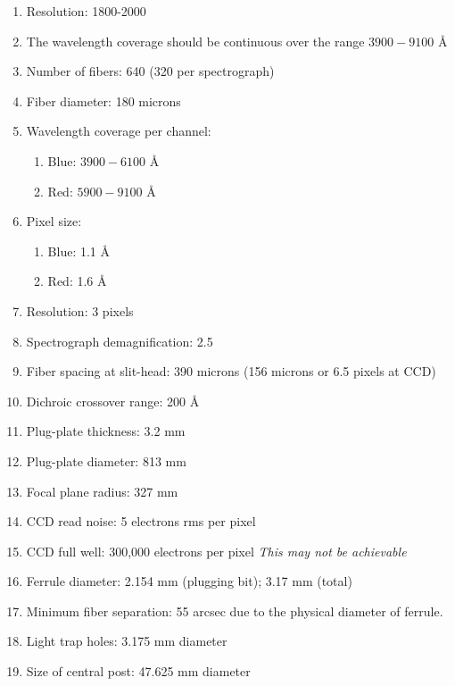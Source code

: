 \begin{enumerate}
\item Resolution: 1800-2000
\item The wavelength coverage should be continuous over the range $3900-9100$ \AA
\item Number of fibers: 640 (320 per spectrograph)
\item Fiber diameter: 180 microns
\item Wavelength coverage per channel:
\begin{enumerate}
\item Blue: $3900-6100$ \AA
\item Red: $5900-9100$ \AA
\end{enumerate}
\item Pixel size: 
\begin{enumerate}
\item Blue: 1.1 \AA
\item Red: 1.6 \AA
\end{enumerate}

\item Resolution: 3 pixels

\item Spectrograph demagnification: 2.5

\item Fiber spacing at slit-head: 390 microns (156 microns or 6.5 pixels at
CCD)

\item Dichroic crossover range: 200 \AA

\item Plug-plate thickness: 3.2 mm

\item Plug-plate diameter: 813 mm

\item Focal plane radius: 327 mm

\item CCD read noise: 5 electrons rms per pixel

\item CCD full well: 300,000 electrons per pixel {\it This may not be achievable}

\item Ferrule diameter: 2.154 mm (plugging bit); 3.17 mm (total)

\item Minimum fiber separation: 55 arcsec due to the physical diameter
of ferrule. 

\item Light trap holes: 3.175 mm diameter

\item Size of central post: 47.625 mm diameter
\end{enumerate}

